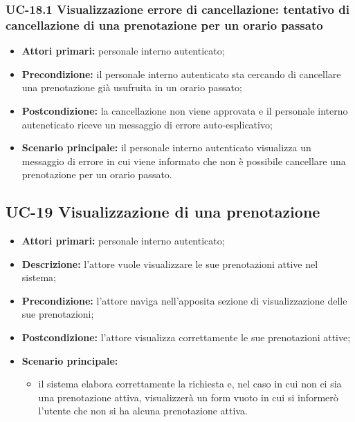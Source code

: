 \subsubsection{UC-18.1 Visualizzazione errore di cancellazione: tentativo di cancellazione di una prenotazione per un orario passato}
\begin{itemize}
\item \textbf{Attori primari:} personale interno autenticato;
\item \textbf{Precondizione:} il personale interno autenticato sta cercando di cancellare una prenotazione già usufruita in un orario passato;
\item \textbf{Postcondizione:} la cancellazione non viene approvata e il personale interno auteneticato riceve un messaggio di errore auto-esplicativo;
\item \textbf{Scenario principale:} il personale interno autenticato visualizza un messaggio di errore in cui viene informato che non è possibile cancellare una prenotazione per un orario passato.
\end{itemize}

\subsection{UC-19 Visualizzazione di una prenotazione}

\begin{itemize}
\item \textbf{Attori primari:} personale interno autenticato;
\item \textbf{Descrizione:} l'attore vuole visualizzare le sue prenotazioni attive nel sistema;
\item \textbf{Precondizione:} l'attore naviga nell’apposita sezione di visualizzazione delle sue prenotazioni;
\item \textbf{Postcondizione:} l'attore visualizza correttamente le sue prenotazioni attive;
\item \textbf{Scenario principale:} 
	\begin{itemize}
		\item il sistema elabora correttamente la richiesta e, nel caso in cui non ci sia una prenotazione attiva, visualizzerà un form vuoto in cui si informerò l'utente che non si ha alcuna prenotazione attiva.
	\end{itemize}
\end{itemize}


